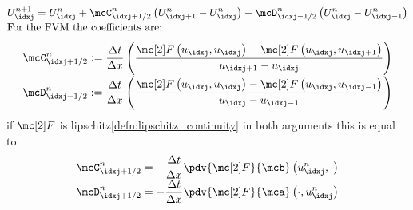 \begin{corbox}\nospacing
    \begin{cor}\label{cor:finite_volume_scheme_incremental_form}
      \begin{align}
        &U_{\idxj}^{n+1}=U_{\idxj}^{n}+\mcC_{\idxj+1/2}^{n} \left(U_{\idxj+1}^{n}-U_{\idxj}^{n}\right)-\mcD_{\idxj-1/2}^{n} \left(U_{\idxj}^{n}-U_{\idxj-1}^{n}\right)\label{eq:finite_volume_scheme_incremental_form}\nonumber \\[-1\jot]
        &\text{For the FVM the coefficients are:}
      \end{align}
      \begin{align}
        \mcC_{\idxj+1/2}^{n}:=\frac{\Delta t}{\Delta x}\left(\frac{\Flux \left(u_{\idxj},u_{\idxj}\right)-\Flux \left(u_{\idxj},u_{\idxj+1}\right)}{u_{\idxj+1}-u_{\idxj}}\right)\\[-1\jot]
        \mcD_{\idxj-1/2}^{n}:=\frac{\Delta t}{\Delta x}\left(\frac{\Flux \left(u_{\idxj},u_{\idxj}\right)-\Flux \left(u_{\idxj},u_{\idxj-1}\right)}{u_{\idxj}-u_{\idxj-1}} \right)
      \end{align}
      if $\Flux$ is lipschitz\cref{defn:lipschitz_continuity} in both arguments this is equal to:
      \begin{align}
        \mcC_{\idxj+1/2}^{n}=-\frac{\Delta t}{\Delta x}\pdv{\Flux}{\mcb}\left(u_{\idxj}^{n},\cdot\right)\\[-1\jot]
        \mcD_{\idxj+1/2}^{n}=-\frac{\Delta t}{\Delta x}\pdv{\Flux}{\mca}\left(\cdot,u_{\idxj}^{n}\right)
      \end{align}
    \end{cor}
\end{corbox}
